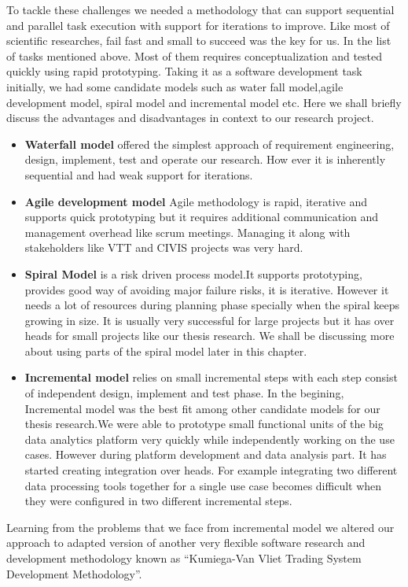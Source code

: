 To tackle these challenges we needed a methodology that can support sequential and parallel task execution with support for iterations to improve. Like most of scientific researches, fail fast and small to succeed was the key for us. In the list of tasks mentioned above. Most of them requires conceptualization and tested quickly using rapid prototyping. Taking it as a software development task initially, we had some candidate models such as water fall model,agile development model, spiral model and incremental model etc. Here we shall briefly discuss the advantages and disadvantages in context to our research project. 
\begin{itemize}
\item \textbf{Waterfall model} offered the simplest approach of requirement engineering, design, implement, test and operate our research. How ever it is inherently sequential and had weak support for iterations.
\item \textbf{Agile development model} Agile methodology\cite{martin2003agile} is rapid, iterative and supports quick prototyping but it requires additional communication and management overhead like scrum meetings. Managing it along with stakeholders like VTT and CIVIS projects was very hard.
\item \textbf{Spiral Model} is a risk driven process model.It supports prototyping, provides good way of avoiding major failure risks, it is iterative. However it needs a lot of resources during planning phase specially when the spiral keeps growing in size. It is usually very successful for large projects but it has over heads for small projects like our thesis research. We shall be discussing more about using parts of the spiral model later in this chapter.
\item \textbf{Incremental model} relies on small incremental steps with each step consist of independent design, implement and test phase. In the begining, Incremental model was the best fit among other candidate models for our thesis research.We were able to prototype small functional units of the big data analytics platform very quickly while independently working on the use cases. However during platform development and data analysis part. It has started creating integration over heads. For example integrating two different data processing tools together for a single use case becomes difficult  when they were configured in two different incremental steps.  
\end{itemize}
Learning from the problems that we face from  incremental model we altered our approach to adapted version of another very flexible software research and development methodology known as ``Kumiega-Van Vliet Trading System Development Methodology''\cite{kumiega2008software}.


